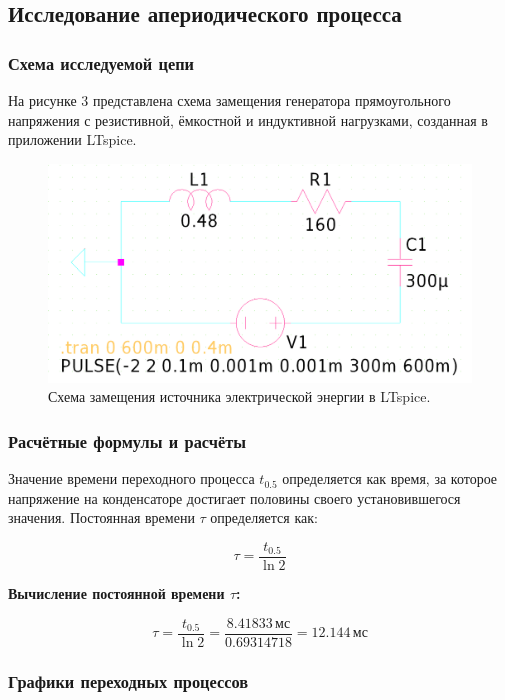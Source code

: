 \subsection{Исследование апериодического процесса}

\subsubsection{Схема исследуемой цепи}
На рисунке 3 представлена схема замещения генератора прямоугольного напряжения с резистивной, ёмкостной и индуктивной нагрузками, созданная в приложении LTspice.

\begin{figure}[H]
	\centering
	\includegraphics[width=1\textwidth]{./data/rcl_1-schema.png}
	\caption{Схема замещения источника электрической энергии в LTspice.}
\end{figure}

\subsubsection{Расчётные формулы и расчёты}

Значение времени переходного процесса \( t_{0.5} \) определяется как время, за которое напряжение на конденсаторе достигает половины своего установившегося значения. Постоянная времени \( \tau \) определяется как:

\[
	\tau = \frac{t_{0.5}}{\ln 2}
\]

\textbf{Вычисление постоянной времени \( \tau \):}

\[
	\tau = \frac{t_{0.5}}{\ln 2} = \frac{8.41833 \, \text{мс}}{0.69314718} = 12.144 \, \text{мс}
\]

\subsubsection{Графики переходных процессов}


